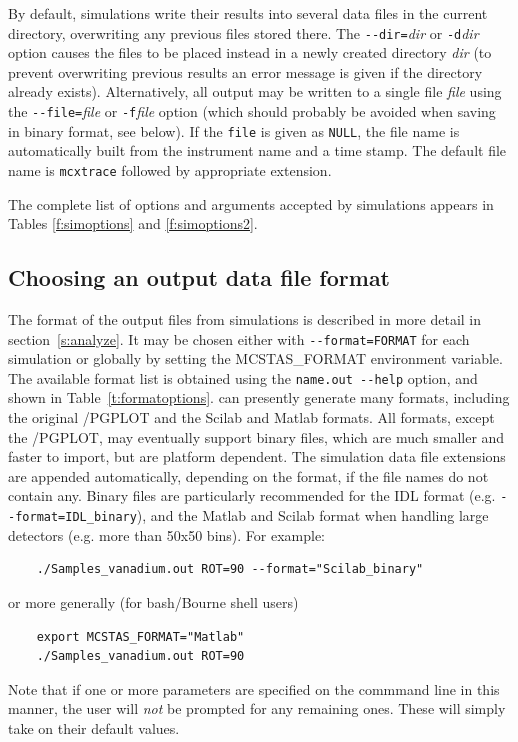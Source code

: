 By default, \MCX simulations write their results into several data files in the
current directory, overwriting any previous files stored there. The
\verb+--dir=+\textit{dir} or \verb+-d+\textit{dir} option causes the files to be
placed instead in a newly created directory \textit{dir} (to prevent overwriting
previous results an error message is given if the directory already exists).
Alternatively, all output may be written to a single file \textit{file} using
the \verb+--file=+\textit{file} or \verb+-f+\textit{file} option (which should
probably be avoided when saving in binary format, see below). If the
\verb+file+ is given as \verb+NULL+, the file name is automatically built from
the instrument name and a time stamp. The default file name is \verb+mcxtrace+
followed by appropriate extension.

The complete list of options
and arguments accepted by \MCX simulations appears in
Tables \ref{f:simoptions} and \ref{f:simoptions2}.

\subsection{Choosing an output data file format}

%
The format of the output files from \MCX simulations is described in
more detail in section~\ref{s:analyze}. It may be chosen either with \verb+--format=FORMAT+ for each simulation or globally by setting the MCSTAS\_FORMAT environment variable. 
The available format list is obtained using the \verb+name.out --help+ option, and shown in Table~\ref{t:formatoptions}.      
\MCX can presently generate many formats, including the original \MCX /PGPLOT and the Scilab and Matlab formats. All formats, except the \MCX /PGPLOT, may eventually support binary files, which are much smaller and faster to import, but are platform dependent. The simulation data file extensions are appended automatically, depending on the format, if the file names do not contain any. Binary files are particularly recommended for the IDL format (e.g. \verb+--format=IDL_binary+), and the Matlab and Scilab format when handling large detectors (e.g. more than 50x50 bins). For example:
\begin{verbatim}
    ./Samples_vanadium.out ROT=90 --format="Scilab_binary"
\end{verbatim}
or more generally (for bash/Bourne shell users)
\begin{verbatim}
    export MCSTAS_FORMAT="Matlab"
    ./Samples_vanadium.out ROT=90
\end{verbatim}
Note that if one or more parameters are specified on the commmand line in this
manner, the user will \emph{not} be prompted for any remaining ones. These will
simply take on their default values.

